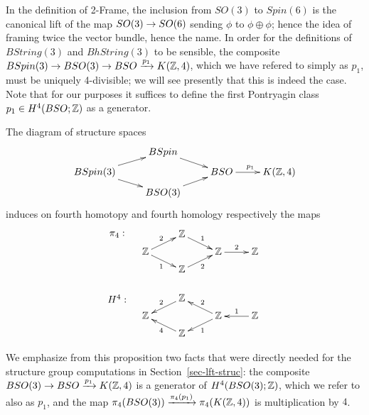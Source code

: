 \documentclass{amsart}
\begin{document}
\nid In the definition of 2-Frame, the inclusion from $SO(3)$ to $Spin(6)$ is the canonical lift of the map $SO(3) \rightarrow SO(6)$ sending $\phi$ to $\phi \oplus \phi$; hence the idea of framing twice the vector bundle, hence the name.  In order for the definitions of $BString(3)$ and $BhString(3)$ to be sensible, the composite $BSpin(3) \rightarrow BSO(3) \rightarrow BSO \xrightarrow{p_1} K(\mathbb Z,4)$, which we have refered to simply as $p_1$, must be uniquely 4-divisible; we will see presently that this is indeed the case.  Note that for our purposes it suffices to define the first Pontryagin class $p_1 \in H^4(BSO;\mathbb Z)$ as a generator.

\begin{proposition} \label{prop-H4}
The diagram of structure spaces
\begin{equation} \nn
\xymatrix@R=5pt{
& BSpin \ar[dr] & & \\
BSpin(3) \ar[ur] \ar[dr] && BSO \ar[r]^{p_1} & K(\ZZ,4) \\
& BSO(3) \ar[ur] & &
}
\end{equation}
induces on fourth homotopy and fourth homology respectively the maps
\begin{equation} \nn
\xymatrix@R=5pt{
\save[]+<-1cm,0cm>*{\pi_4:}\restore & \ZZ \ar[dr]^{1} & & \\
\ZZ \ar[ur]^{2} \ar[dr]_{1} && \ZZ \ar[r]^{2} & \ZZ \\
& \ZZ \ar[ur]_{2} & & \\
&&& \\
\save[]+<-1cm,0cm>*{H^4:}\restore & \ZZ \ar[dl]_{2} & & \\
\ZZ && \ZZ \ar[ul]_{2} \ar[dl]^{1} & \ZZ \ar[l]_{1} \\
& \ZZ \ar[ul]^{4} & &
}
\end{equation}
\end{proposition}

We emphasize from this proposition two facts that were directly needed for the structure group computations in Section~\ref{sec-lft-struc}: the composite $BSO(3) \rightarrow BSO \xrightarrow{p_1} K(\mathbb Z,4)$ is a generator of $H^4(BSO(3);\mathbb Z)$, which we refer to also as $p_1$, and the map $\pi_4(BSO(3)) \xrightarrow{\pi_4(p_1)} \pi_4(K(\mathbb Z,4))$ is multiplication by $4$.
\end{document}

